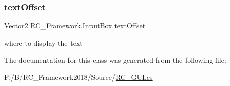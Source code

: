 \subsubsection{\texorpdfstring{text\+Offset}{textOffset}}
{\footnotesize\ttfamily Vector2 R\+C\+\_\+\+Framework.\+Input\+Box.\+text\+Offset}



where to display the text 



The documentation for this class was generated from the following file\+:\begin{DoxyCompactItemize}
\item 
F\+:/\+B/\+R\+C\+\_\+\+Framework2018/\+Source/\mbox{\hyperlink{_r_c___g_u_i_8cs}{R\+C\+\_\+\+G\+U\+I.\+cs}}\end{DoxyCompactItemize}
